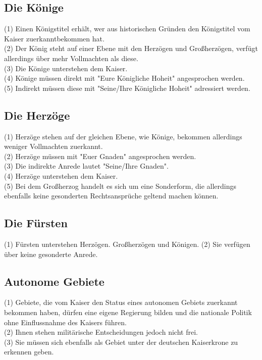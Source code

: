 \documentclass{article}
\begin{document}
\subsection{Die Könige}
(1) Einen Königstitel erhält, wer aus historischen Gründen den Königstitel vom Kaiser zuerkanntbekommen hat.\\
(2) Der König steht auf einer Ebene mit den Herzögen und Großherzögen, verfügt allerdings über mehr Vollmachten als diese.\\
(3) Die Könige unterstehen dem Kaiser.\\
(4) Könige müssen direkt mit "Eure Königliche Hoheit" angesprochen werden.\\
(5) Indirekt müssen diese mit "Seine/Ihre Königliche Hoheit" adressiert werden.

\subsection{Die Herzöge}
(1) Herzöge stehen auf der gleichen Ebene, wie Könige, bekommen allerdings weniger Vollmachten zuerkannt.\\
(2) Herzöge müssen mit "Euer Gnaden" angesprochen werden.\\
(3) Die indirekte Anrede lautet "Seine/Ihre Gnaden".\\
(4) Herzöge unterstehen dem Kaiser.\\
(5) Bei dem Großherzog handelt es sich um eine Sonderform, die allerdings ebenfalls keine gesonderten Rechtsansprüche geltend machen können.

\subsection{Die Fürsten}
(1) Fürsten unterstehen Herzögen. Großherzögen und Königen.
(2) Sie verfügen über keine gesonderte Anrede.

\subsection{Autonome Gebiete}
(1) Gebiete, die vom Kaiser den Status eines autonomen Gebiets zuerkannt bekommen haben, dürfen eine eigene Regierung bilden und die nationale Politik ohne Einflussnahme des Kaisers führen.\\
(2) Ihnen stehen militärische Entscheidungen jedoch nicht frei.\\
(3) Sie müssen sich ebenfalls als Gebiet unter der deutschen Kaiserkrone zu erkennen geben.
\end{document}
